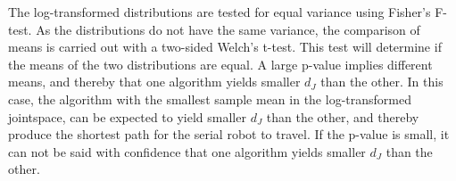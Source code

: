 The log-transformed distributions are tested for equal variance
using Fisher's F-test.
As the distributions do not have the same variance,
the comparison of means is carried out with a two-sided Welch's t-test.
This test will determine if the means of the two distributions are equal.
A large p-value implies different means, and thereby that one algorithm
yields smaller \(d_J\) than the other.
In this case, the algorithm with the smallest sample mean in the log-transformed jointspace,
can be expected to yield smaller \(d_J\) than the other, and thereby produce the shortest
path for the serial robot to travel.
If the p-value is small, it can not be said with confidence that one algorithm
yields smaller \(d_J\) than the other.